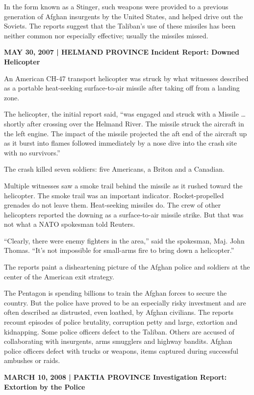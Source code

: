 ﻿\documentclass[12pt]{article}
\begin{document}
In the form known as a Stinger, such weapons were provided to a previous generation of Afghan
insurgents by the United States, and helped drive out the Soviets. The reports suggest that the
Taliban's use of these missiles has been neither common nor especially effective; usually the
missiles missed.

\textbf{MAY 30, 2007 | HELMAND PROVINCE Incident Report: Downed Helicopter}

An American CH-47 transport helicopter was struck by what witnesses described as a portable
heat-seeking surface-to-air missile after taking off from a landing zone.

The helicopter, the initial report said, ``was engaged and struck with a Missile \ldots shortly
after crossing over the Helmand River. The missile struck the aircraft in the left engine. The
impact of the missile projected the aft end of the aircraft up as it burst into flames followed
immediately by a nose dive into the crash site with no survivors.''

The crash killed seven soldiers: five Americans, a Briton and a Canadian.

Multiple witnesses saw a smoke trail behind the missile as it rushed toward the helicopter. The
smoke trail was an important indicator. Rocket-propelled grenades do not leave them. Heat-seeking
missiles do. The crew of other helicopters reported the downing as a surface-to-air missile strike.
But that was not what a NATO spokesman told Reuters.

``Clearly, there were enemy fighters in the area,'' said the spokesman, Maj. John Thomas. ``It's not
impossible for small-arms fire to bring down a helicopter.''

The reports paint a disheartening picture of the Afghan police and soldiers at the center of the
American exit strategy.

The Pentagon is spending billions to train the Afghan forces to secure the country. But the police
have proved to be an especially risky investment and are often described as distrusted, even
loathed, by Afghan civilians. The reports recount episodes of police brutality, corruption petty and
large, extortion and kidnapping. Some police officers defect to the Taliban. Others are accused of
collaborating with insurgents, arms smugglers and highway bandits. Afghan police officers defect
with trucks or weapons, items captured during successful ambushes or raids.

\textbf{MARCH 10, 2008 | PAKTIA PROVINCE Investigation Report: Extortion by the Police}
\end{document}
